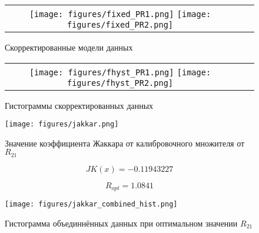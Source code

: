 \documentclass[../main.tex]{subfiles}
\begin{document}
\begin{figure}[H]
	\begin{tabular}{ccc}
		\texttt{[image: figures/fixed\_PR1.png]}
		\texttt{[image: figures/fixed\_PR2.png]}
	\end{tabular}
	\caption{Скорректированные модели данных} 
\end{figure}

\begin{figure}[H]
	\begin{tabular}{ccc}
		\texttt{[image: figures/fhyst\_PR1.png]}
		\texttt{[image: figures/fhyst\_PR2.png]}
	\end{tabular}
	\caption{Гистограммы скорректированных данных} 
\end{figure}

\begin{figure}[H]
	\begin{center}{}
		\texttt{[image: figures/jakkar.png]}
	\end{center}
	\caption{Значение коэффициента Жаккара от калибровочного множителя от $R_{21}$} 
\end{figure}
        \begin{equation}
            JK(x) = -0.11943227
        \end{equation}
        
        \begin{equation}
            R_{opt} = 1.0841
        \end{equation}


\begin{figure}[H]
	\begin{center}
		\texttt{[image: figures/jakkar\_combined\_hist.png]}
	\end{center}
	\caption{Гистограмма объединнённых данных при оптимальном значении $R_{21}$} 
\end{figure}
\end{document}
